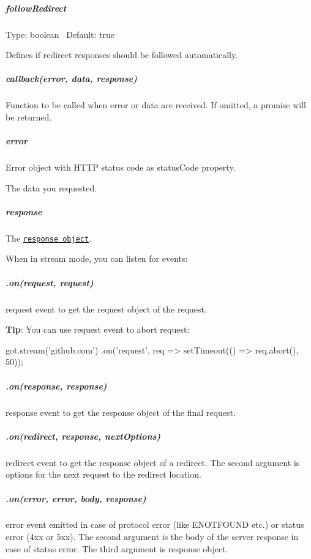 \subparagraph*{follow\+Redirect}

Type\+: {\ttfamily boolean}~\newline
 Default\+: {\ttfamily true}

Defines if redirect responses should be followed automatically.

\subparagraph*{callback(error, data, response)}

Function to be called when error or data are received. If omitted, a promise will be returned.

\subparagraph*{error}

{\ttfamily Error} object with H\+T\+TP status code as {\ttfamily status\+Code} property.

The data you requested.

\subparagraph*{response}

The \href{http://nodejs.org/api/http.html#http_http_incomingmessage}{\tt response object}.

When in stream mode, you can listen for events\+:

\subparagraph*{.on(\textquotesingle{}request\textquotesingle{}, request)}

{\ttfamily request} event to get the request object of the request.

{\bfseries Tip}\+: You can use {\ttfamily request} event to abort request\+:


\begin{DoxyCode}
got.stream('github.com')
    .on('request', req => setTimeout(() => req.abort(), 50));
\end{DoxyCode}


\subparagraph*{.on(\textquotesingle{}response\textquotesingle{}, response)}

{\ttfamily response} event to get the response object of the final request.

\subparagraph*{.on(\textquotesingle{}redirect\textquotesingle{}, response, next\+Options)}

{\ttfamily redirect} event to get the response object of a redirect. The second argument is options for the next request to the redirect location.

\subparagraph*{.on(\textquotesingle{}error\textquotesingle{}, error, body, response)}

{\ttfamily error} event emitted in case of protocol error (like {\ttfamily E\+N\+O\+T\+F\+O\+U\+ND} etc.) or status error (4xx or 5xx). The second argument is the body of the server response in case of status error. The third argument is response object.

